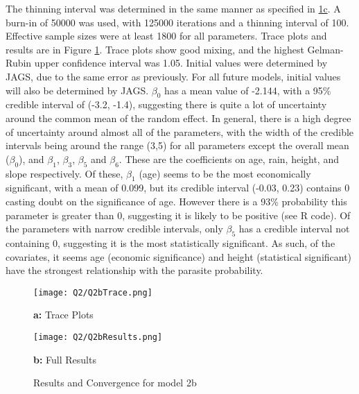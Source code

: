 \documentclass[11pt]{article}
\begin{document}
\vspace*{4mm}
The thinning interval was determined in the same manner as specified in \hyperref[sec::1c]{1c}. A burn-in of 50000 was used, with 125000 iterations and a thinning interval of 100. Effective sample sizes were at least 1800 for all parameters. Trace plots and results are in Figure \ref{Fig::2bTraceResults}. Trace plots show good mixing, and the highest Gelman-Rubin upper confidence interval was 1.05. Initial values were determined by JAGS, due to the same error as previously. For all future models, initial values will also be determined by JAGS. $\beta_0$ has a mean value of -2.144, with a 95\% credible interval of (-3.2, -1.4), suggesting there is quite a lot of uncertainty around the common mean of the random effect. In general, there is a high degree of uncertainty around almost all of the parameters, with the width of the credible intervals being around the range (3,5) for all parameters except the overall mean ($\beta_0$), and $\beta_1$, $\beta_3$, $\beta_5$ and $\beta_6$. These are the coefficients on age, rain, height, and slope respectively. Of these, $\beta_1$ (age) seems to be the most economically significant, with a mean of 0.099, but its credible interval (-0.03, 0.23) contains 0 casting doubt on the significance of age. However there is a 93\% probability this parameter is greater than 0, suggesting it is likely to be positive (see R code). Of the parameters with narrow credible intervals, only $\beta_5$ has a credible interval not containing 0, suggesting it is the most statistically significant. As such, of the covariates, it seems age (economic significance) and height (statistical significant) have the strongest relationship with the parasite probability. 


\begin{figure}[!h]
    \begin{minipage}[l]{0.5\textwidth}
        \texttt{[image: Q2/Q2bTrace.png]}
        \centerline{\textbf{a:} Trace Plots}
    \end{minipage}
    \begin{minipage}[pos=r]{0.5\textwidth}
        \texttt{[image: Q2/Q2bResults.png]}
        \centerline{\textbf{b:} Full Results}
    \end{minipage}
\caption{Results and Convergence for model 2b} \label{Fig::2bTraceResults}
\end{figure}
\end{document}
